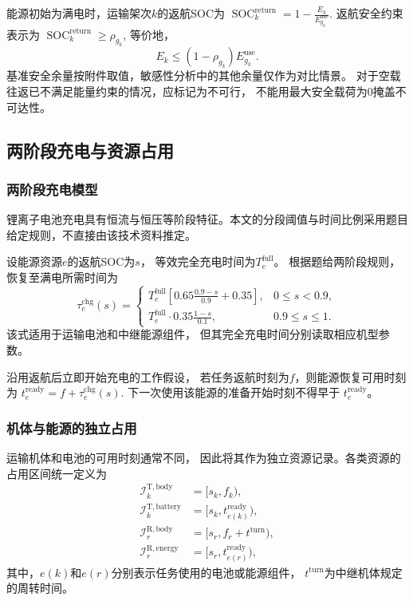 \documentclass[bwprint]{gmcmthesis}
\begin{document}
能源初始为满电时，运输架次$k$的返航SOC为
\(\operatorname{SOC}_k^{\mathrm{return}} = 1-\frac{E_k}{E_{g_k}^{\mathrm{use}}}\).
返航安全约束表示为
\(\operatorname{SOC}_k^{\mathrm{return}} \geq \rho_{g_k}\),
等价地，
\begin{equation}
    E_k
    \leq
    (1-\rho_{g_k})E_{g_k}^{\mathrm{use}}.
\end{equation}
基准安全余量按附件取值，敏感性分析中的其他余量仅作为对比情景。
对于空载往返已不满足能量约束的情况，应标记为不可行，
不能用最大安全载荷为0掩盖不可达性。

\subsection{两阶段充电与资源占用}

\subsubsection{两阶段充电模型}
锂离子电池充电具有恒流与恒压等阶段特征\cite{ti2022}。本文的分段阈值与时间比例采用题目给定规则，不直接由该技术资料推定。


设能源资源$e$的返航SOC为$s$，
等效完全充电时间为$T_e^{\mathrm{full}}$。
根据题给两阶段规则，恢复至满电所需时间为
\begin{equation}
    \tau_e^{\mathrm{chg}}(s)
    =
    \begin{cases}
        T_e^{\mathrm{full}}
        \left[
        0.65\displaystyle\frac{0.9-s}{0.9}+0.35
        \right],
        & 0\leq s<0.9,\\[8pt]
        T_e^{\mathrm{full}}
        \cdot0.35\displaystyle\frac{1-s}{0.1},
        & 0.9\leq s\leq1.
    \end{cases}
\end{equation}
该式适用于运输电池和中继能源组件，
但其完全充电时间分别读取相应机型参数。

沿用返航后立即开始充电的工作假设，
若任务返航时刻为$f$，则能源恢复可用时刻为
\(t_e^{\mathrm{ready}} = f+\tau_e^{\mathrm{chg}}(s)\).
下一次使用该能源的准备开始时刻不得早于
$t_e^{\mathrm{ready}}$。

\subsubsection{机体与能源的独立占用}

运输机体和电池的可用时刻通常不同，
因此将其作为独立资源记录。各类资源的占用区间统一定义为
\begin{align}
    \mathcal{I}_k^{\mathrm{T,body}}
    &=[s_k,f_k),\\
    \mathcal{I}_k^{\mathrm{T,battery}}
    &=[s_k,t_{e(k)}^{\mathrm{ready}}),\\
    \mathcal{I}_r^{\mathrm{R,body}}
    &=[s_r,f_r+t^{\mathrm{turn}}),\\
    \mathcal{I}_r^{\mathrm{R,energy}}
    &=[s_r,t_{e(r)}^{\mathrm{ready}}),
\end{align}
其中，$e(k)$和$e(r)$分别表示任务使用的电池或能源组件，
$t^{\mathrm{turn}}$为中继机体规定的周转时间。
\end{document}
